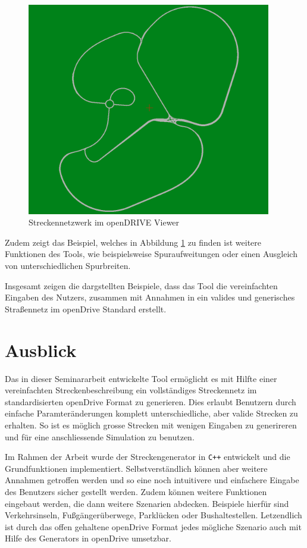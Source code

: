 \begin{figure}[H]
	\flushleft
	\includegraphics[width=0.95\textwidth]{fig/fig8.png}
	\caption{Streckennetzwerk im openDRIVE Viewer}
	\label{abb7}
\end{figure}

Zudem zeigt das Beispiel, welches in Abbildung  \ref{abb7} zu finden ist weitere Funktionen des Tools, wie beispielsweise Spuraufweitungen oder einen Ausgleich von unterschiedlichen Spurbreiten.

Insgesamt zeigen die dargstellten Beispiele, dass das Tool die vereinfachten Eingaben des Nutzers, zusammen mit Annahmen in ein valides und generisches Straßennetz im openDrive Standard erstellt.

\chapter{Ausblick}

Das in dieser Seminararbeit entwickelte Tool ermöglicht es mit Hilfte einer vereinfachten Streckenbeschreibung ein vollständiges Streckennetz im standardisierten openDrive Format zu generieren. Dies erlaubt Benutzern durch einfache Paramteränderungen komplett unterschiedliche, aber valide Strecken zu erhalten. So ist es möglich grosse Strecken mit wenigen Eingaben zu generireren und für eine anschliessende Simulation zu benutzen.

Im Rahmen der Arbeit wurde der Streckengenerator in \texttt{C++} entwickelt und die Grundfunktionen implementiert. Selbstverständlich können aber weitere Annahmen getroffen werden und so eine noch intuitivere und einfachere Eingabe des Benutzers sicher gestellt werden. Zudem können weitere Funktionen eingebaut werden, die dann weitere Szenarien abdecken. Beispiele hierfür sind Verkehrsinseln, Fußgängerüberwege, Parklücken oder Bushaltestellen. Letzendlich ist durch das offen gehaltene openDrive Format jedes mögliche Szenario auch mit Hilfe des Generators in openDrive umsetzbar.

